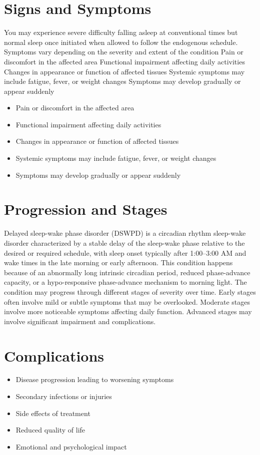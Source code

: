 \section{Signs and Symptoms}
You may experience severe difficulty falling asleep at conventional times but normal sleep once initiated when allowed to follow the endogenous schedule. Symptoms vary depending on the severity and extent of the condition Pain or discomfort in the affected area Functional impairment affecting daily activities Changes in appearance or function of affected tissues Systemic symptoms may include fatigue, fever, or weight changes Symptoms may develop gradually or appear suddenly

\begin{itemize}[noitemsep]
  \item Pain or discomfort in the affected area
  \item Functional impairment affecting daily activities
  \item Changes in appearance or function of affected tissues
  \item Systemic symptoms may include fatigue, fever, or weight changes
  \item Symptoms may develop gradually or appear suddenly
\end{itemize}
\section{Progression and Stages}
Delayed sleep-wake phase disorder (DSWPD) is a circadian rhythm sleep-wake disorder characterized by a stable delay of the sleep-wake phase relative to the desired or required schedule, with sleep onset typically after 1:00--3:00 AM and wake times in the late morning or early afternoon. This condition happens because of an abnormally long intrinsic circadian period, reduced phase-advance capacity, or a hypo-responsive phase-advance mechanism to morning light. The condition may progress through different stages of severity over time. Early stages often involve mild or subtle symptoms that may be overlooked. Moderate stages involve more noticeable symptoms affecting daily function. Advanced stages may involve significant impairment and complications.
\section{Complications}
\begin{itemize}[noitemsep]
  \item Disease progression leading to worsening symptoms
  \item Secondary infections or injuries
  \item Side effects of treatment
  \item Reduced quality of life
  \item Emotional and psychological impact
\end{itemize}
